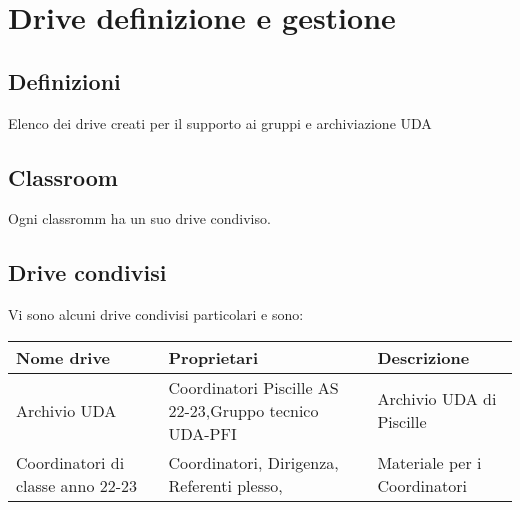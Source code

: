 \chapter{Drive definizione e gestione}
\section{Definizioni}
Elenco dei drive creati per il supporto ai gruppi e archiviazione UDA
\section{Classroom}
Ogni classromm  ha un suo drive condiviso.
\section{Drive condivisi}
Vi sono alcuni drive condivisi particolari e sono:

\begin{center}
	\begin{tabular}{p{3.2cm}p{3.2cm}p{3.2cm}}
\toprule
Nome drive	& Proprietari &  Descrizione \\
\midrule
Archivio UDA\index{UDA!Archivio}	& Coordinatori Piscille AS 22-23,Gruppo tecnico UDA-PFI & Archivio UDA di Piscille \\
Coordinatori di classe anno 22-23&Coordinatori, Dirigenza, Referenti plesso, &Materiale per i Coordinatori\\
\bottomrule
\end{tabular}
\end{center}
